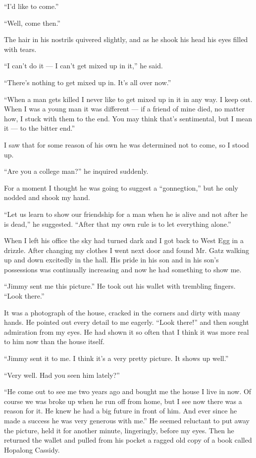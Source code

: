\documentclass{znotebook}
\begin{document}
``I'd like to come.''

``Well, come then.''

The hair in his nostrils quivered slightly, and as he shook his head his eyes filled with tears.

``I can't do it — I can't get mixed up in it,'' he said.

``There's nothing to get mixed up in. It's all over now.''

``When a man gets killed I never like to get mixed up in it in any way. I keep out. When I was a young man it was different — if a friend of mine died, no matter how, I stuck with them to the end. You may think that's sentimental, but I mean it — to the bitter end.''

I saw that for some reason of his own he was determined not to come, so I stood up.

``Are you a college man?'' he inquired suddenly.

For a moment I thought he was going to suggest a ``gonnegtion,'' but he only nodded and shook my hand.

``Let us learn to show our friendship for a man when he is alive and not after he is dead,'' he suggested. ``After that my own rule is to let everything alone.''

When I left his office the sky had turned dark and I got back to West Egg in a drizzle. After changing my clothes I went next door and found Mr. Gatz walking up and down excitedly in the hall. His pride in his son and in his son's possessions was continually increasing and now he had something to show me.

``Jimmy sent me this picture.'' He took out his wallet with trembling fingers. ``Look there.''

It was a photograph of the house, cracked in the corners and dirty with many hands. He pointed out every detail to me eagerly. ``Look there!'' and then sought admiration from my eyes. He had shown it so often that I think it was more real to him now than the house itself.

``Jimmy sent it to me. I think it's a very pretty picture. It shows up well.''

``Very well. Had you seen him lately?''

``He come out to see me two years ago and bought me the house I live in now. Of course we was broke up when he run off from home, but I see now there was a reason for it. He knew he had a big future in front of him. And ever since he made a success he was very generous with me.'' He seemed reluctant to put away the picture, held it for another minute, lingeringly, before my eyes. Then he returned the wallet and pulled from his pocket a ragged old copy of a book called Hopalong Cassidy.
\end{document}
